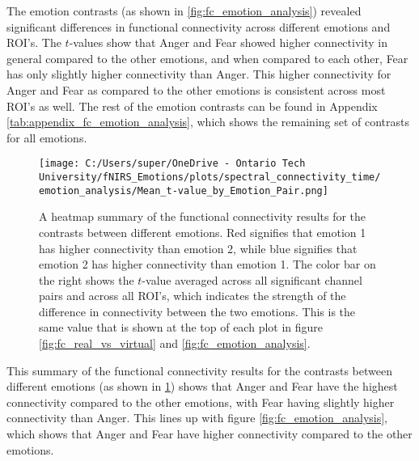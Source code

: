 The emotion contrasts (as shown in \ref{fig:fc_emotion_analysis}) revealed significant differences in functional connectivity across different emotions and ROI's.
The $t$-values show that Anger and Fear showed higher connectivity in general compared to the other emotions, and when compared to each other, Fear has only slightly higher connectivity than Anger. 
This higher connectivity for Anger and Fear as compared to the other emotions is consistent across most ROI's as well. 
The rest of the emotion contrasts can be found in Appendix \ref{tab:appendix_fc_emotion_analysis}, which shows the remaining set of contrasts for all emotions.

\begin{figure}[H]
  \centering
  \texttt{[image: C:/Users/super/OneDrive - Ontario Tech University/fNIRS\_Emotions/plots/spectral\_connectivity\_time/emotion\_analysis/Mean\_t-value\_by\_Emotion\_Pair.png]}
  \caption[FC: Summary of Contrasts by Emotion Pair]{A heatmap summary of the functional connectivity results for the contrasts between different emotions.
  Red signifies that emotion 1 has higher connectivity than emotion 2, while blue signifies that emotion 2 has higher connectivity than emotion 1.
  The color bar on the right shows the $t$-value averaged across all significant channel pairs and across all ROI's, which indicates the strength of the difference in connectivity between the two emotions.
  This is the same value that is shown at the top of each plot in figure \ref{fig:fc_real_vs_virtual} and \ref{fig:fc_emotion_analysis}.}
  \label{fig:fc_emotion_summary_analysis}
\end{figure}

This summary of the functional connectivity results for the contrasts between different emotions (as shown in \ref{fig:fc_emotion_summary_analysis}) shows that Anger and Fear have the highest connectivity compared to the other emotions, with Fear having slightly higher connectivity than Anger.
This lines up with figure \ref{fig:fc_emotion_analysis}, which shows that Anger and Fear have higher connectivity compared to the other emotions.


